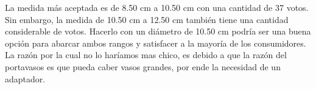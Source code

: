
La medida más aceptada es de 8.50 cm a 10.50 cm con una cantidad de 37 votos. Sin embargo, la medida de 10.50 cm a 12.50 cm también tiene una cantidad considerable de votos. Hacerlo con un diámetro de 10.50 cm podría ser una buena opción para abarcar ambos rangos y satisfacer a la mayoría de los consumidores. La razón por la cual no lo haríamos mas chico, es debido a que la razón del portavasos es que pueda caber vasos grandes, por ende la necesidad de un adaptador. 